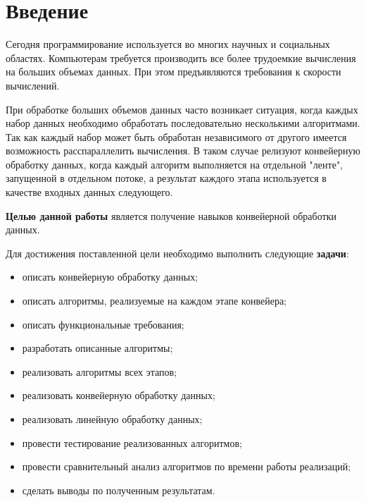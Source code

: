 \chapter*{Введение}

Сегодня программирование используется во многих научных и социальных областях.
Компьютерам требуется производить все более трудоемкие вычисления на больших
объемах данных. При этом предъявляются требования к скорости вычислений.

При обработке больших объемов данных часто возникает ситуация, когда каждых
набор данных необходимо обработать последовательно несколькими алгоритмами. Так
как каждый набор может быть обработан независимого от другого имеется
возможность расспараллелить вычисления. В таком случае релизуют конвейерную
обработку данных, когда каждый алгоритм выполняется на отдельной "ленте"{},
запущенной в отдельном потоке, а результат каждого этапа используется в
качестве входных данных следующего.

\textbf{Целью данной работы} является получение навыков
конвейерной обработки данных.

Для достижения поставленной цели необходимо выполнить следующие
\textbf{задачи}:
\begin{itemize}[left=\parindent]
    \item описать конвейерную обработку данных;
    \item описать алгоритмы, реализуемые на каждом этапе конвейера;
    \item описать функциональные требования;
    \item разработать описанные алгоритмы;
    \item реализовать алгоритмы всех этапов;
    \item реализовать конвейерную обработку данных;
    \item реализовать линейную обработку данных;
    \item провести тестирование реализованных алгоритмов;
    \item провести сравнительный анализ алгоритмов по времени работы
          реализаций;
    \item сделать выводы по полученным результатам.
\end{itemize}
